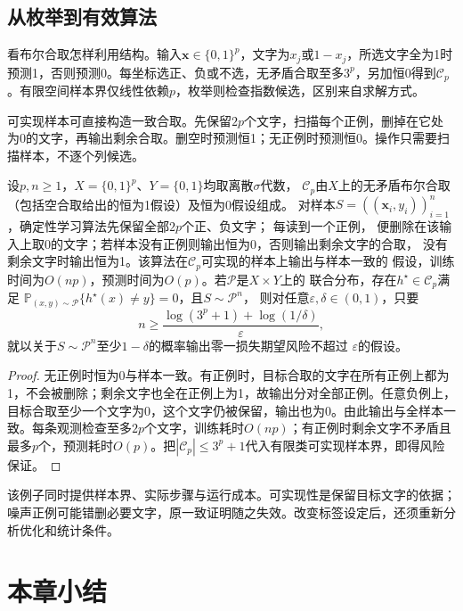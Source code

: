 \subsection{从枚举到有效算法}

看布尔合取怎样利用结构。输入$\bm x\in\{0,1\}^p$，文字为$x_j$或$1-x_j$，所选文字全为1时预测1，否则预测0。每坐标选正、负或不选，无矛盾合取至多$3^p$，另加恒0得到$\mathcal C_p$。有限空间样本界仅线性依赖$p$，枚举则检查指数候选，区别来自求解方式。

可实现样本可直接构造一致合取。先保留$2p$个文字，扫描每个正例，删掉在它处为0的文字，再输出剩余合取。删空时预测恒1；无正例时预测恒0。操作只需要扫描样本，不逐个列候选。

\begin{theorem}[布尔合取的高效可实现学习]
\label{thm:efficient-conjunction-learning}
设$p,n\geq1$，$X=\{0,1\}^p$、$Y=\{0,1\}$均取离散$\sigma$代数，
$\mathcal C_p$由$X$上的无矛盾布尔合取（包括空合取给出的恒为1假设）及恒为0假设组成。
对样本$S=((\bm x_i,y_i))_{i=1}^n$，确定性学习算法先保留全部$2p$个正、负文字；
每读到一个正例，
便删除在该输入上取0的文字；若样本没有正例则输出恒为0，否则输出剩余文字的合取，
没有剩余文字时输出恒为1。该算法在$\mathcal C_p$可实现的样本上输出与样本一致的
假设，训练时间为$O(np)$，预测时间为$O(p)$。若$\mathcal P$是$X\times Y$上的
联合分布，存在$h^\star\in\mathcal C_p$满足
$\mathbb P_{(x,y)\sim\mathcal P}\{h^\star(x)\neq y\}=0$，且$S\sim\mathcal P^n$，
则对任意$\varepsilon,\delta\in(0,1)$，只要
\[
 n\geq\frac{\log(3^p+1)+\log(1/\delta)}{\varepsilon},
\]
就以关于$S\sim\mathcal P^n$至少$1-\delta$的概率输出零一损失期望风险不超过
$\varepsilon$的假设。
\end{theorem}

\begin{proof}
无正例时恒为0与样本一致。有正例时，目标合取的文字在所有正例上都为1，不会被删除；剩余文字也全在正例上为1，故输出分对全部正例。任意负例上，目标合取至少一个文字为0，这个文字仍被保留，输出也为0。由此输出与全样本一致。每条观测检查至多$2p$个文字，训练耗时$O(np)$；有正例时剩余文字不矛盾且最多$p$个，预测耗时$O(p)$。把$|\mathcal C_p|\leq3^p+1$代入有限类可实现样本界，即得风险保证。
\end{proof}

该例子同时提供样本界、实际步骤与运行成本。可实现性是保留目标文字的依据；噪声正例可能错删必要文字，原一致证明随之失效。改变标签设定后，还须重新分析优化和统计条件。

\section{本章小结}
\label{sec:binary-learning-summary}

